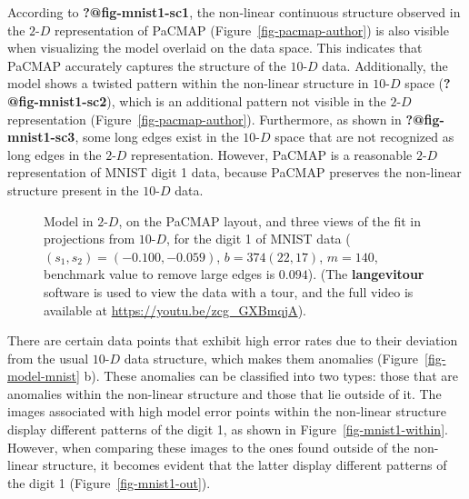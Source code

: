 \documentclass[
  12pt]{article}
\newcommand\gD{$2\text{-}D$}
\begin{document}
According to \textbf{?@fig-mnist1-sc1}, the non-linear continuous
structure observed in the \gD{} representation of PaCMAP
(Figure~\ref{fig-pacmap-author}) is also visible when visualizing the
model overlaid on the data space. This indicates that PaCMAP accurately
captures the structure of the \(10\text{-}D\) data. Additionally, the
model shows a twisted pattern within the non-linear structure in
\(10\text{-}D\) space (\textbf{?@fig-mnist1-sc2}), which is an
additional pattern not visible in the \gD{} representation
(Figure~\ref{fig-pacmap-author}). Furthermore, as shown in
\textbf{?@fig-mnist1-sc3}, some long edges exist in the \(10\text{-}D\)
space that are not recognized as long edges in the \gD{} representation.
However, PaCMAP is a reasonable \gD{} representation of MNIST digit 1
data, because PaCMAP preserves the non-linear structure present in the
\(10\text{-}D\) data.

\begin{figure}[H]


\caption{\label{fig-mnist-tri-proj}Model in \gD{}, on the PaCMAP layout,
and three views of the fit in projections from \(10\text{-}D\), for the
digit 1 of MNIST data (\((s_1,  s_2) = (-0.100,  -0.059)\),
\(b = 374   (22,  17)\), \(m = 140\), benchmark value to remove large
edges is \(0.094\)). (The \textbf{langevitour} software is used to view
the data with a tour, and the full video is available at
\url{https://youtu.be/zcg_GXBmqjA}).}

\end{figure}%

There are certain data points that exhibit high error rates due to their
deviation from the usual \(10\text{-}D\) data structure, which makes
them anomalies (Figure~\ref{fig-model-mnist} b). These anomalies can be
classified into two types: those that are anomalies within the
non-linear structure and those that lie outside of it. The images
associated with high model error points within the non-linear structure
display different patterns of the digit 1, as shown in
Figure~\ref{fig-mnist1-within}. However, when comparing these images to
the ones found outside of the non-linear structure, it becomes evident
that the latter display different patterns of the digit 1
(Figure~\ref{fig-mnist1-out}).
\end{document}
